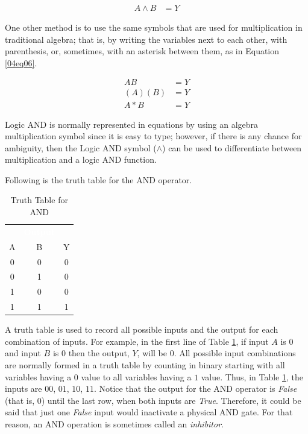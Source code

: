 \begin{align}
  \label{04eq05}
  A \wedge B &= Y 
\end{align}

One other method is to use the same symbols that are used for multiplication in traditional algebra; that is, by writing the variables next to each other, with parenthesis, or, sometimes, with an asterisk between them, as in Equation \ref{04eq06}.

\begin{align}
  \label{04eq06}
  AB &= Y \\
  \nonumber
  (A)(B) &= Y \\
  \nonumber
  A * B &= Y
\end{align}

 Logic \textsf{AND} is normally represented in equations by using an algebra multiplication symbol since it is easy to type; however, if there is any chance for ambiguity, then the Logic \textsf{AND}  symbol ($ \wedge $) can be used to differentiate between multiplication and a logic \textsf{AND}  function.

Following is the truth table for the \textsf{AND}  operator.

\begin{table}[H]
  \sffamily
  \newcommand{\head}[1]{\textcolor{white}{\textbf{#1}}}    
  \begin{center}
    \begin{tabular}{ccc} 
      \rowcolor{black!75}
      \multicolumn{2}{c}{\head{Inputs}} & \head{Output} \\
      A & B & Y \\
      \hline
      0 & 0 & 0 \\
      0 & 1 & 0 \\
      1 & 0 & 0 \\
      1 & 1 & 1 
    \end{tabular}
  \end{center}
  \caption{Truth Table for AND}
  \label{04tt01}
\end{table}

A truth table is used to record all possible inputs and the output for each combination of inputs. For example, in the first line of Table \ref{04tt01}, if input $ A $ is $ 0 $ and input $ B $ is $ 0 $ then the output, $ Y $, will be $ 0 $. All possible input combinations are normally formed in a truth table by counting in binary starting with all variables having a $ 0 $ value to all variables having a $ 1 $ value. Thus, in Table \ref{04tt01}, the inputs are $ 00 $, $ 01$, $ 10$, $ 11 $. Notice that the output for the \textsf{AND}  operator is \emph{False} (that is, $ 0 $) until the last row, when both inputs are \emph{True}. Therefore, it could be said that just one \emph{False} input would inactivate a physical \textsf{AND}  gate. For that reason, an \textsf{AND}  operation is sometimes called an \emph{inhibitor}.

